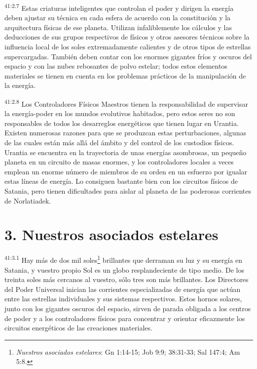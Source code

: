 \par
\textsuperscript{41:2.7} Estas criaturas inteligentes que controlan el poder y dirigen la energía deben ajustar su técnica en cada esfera de acuerdo con la constitución y la arquitectura físicas de ese planeta. Utilizan infaliblemente los cálculos y las deducciones de sus grupos respectivos de físicos y otros asesores técnicos sobre la influencia local de los soles extremadamente calientes y de otros tipos de estrellas supercargadas. También deben contar con los enormes gigantes fríos y oscuros del espacio y con las nubes rebosantes de polvo estelar; todos estos elementos materiales se tienen en cuenta en los problemas prácticos de la manipulación de la energía.

\par
\textsuperscript{41:2.8} Los Controladores Físicos Maestros tienen la responsabilidad de supervisar la energía-poder en los mundos evolutivos habitados, pero estos seres no son responsables de todos los desarreglos energéticos que tienen lugar en Urantia. Existen numerosas razones para que se produzcan estas perturbaciones, algunas de las cuales están más allá del ámbito y del control de los custodios físicos. Urantia se encuentra en la trayectoria de unas energías asombrosas, un pequeño planeta en un circuito de masas enormes, y los controladores locales a veces emplean un enorme número de miembros de su orden en un esfuerzo por igualar estas líneas de energía. Lo consiguen bastante bien con los circuitos físicos de Satania, pero tienen dificultades para aislar al planeta de las poderosas corrientes de Norlatiadek.

\section*{3. Nuestros asociados estelares}
\par
\textsuperscript{41:3.1} Hay más de dos mil soles\footnote{\textit{Nuestros asociados estelares}: Gn 1:14-15; Job 9:9; 38:31-33; Sal 147:4; Am 5:8.} brillantes que derraman su luz y su energía en Satania, y vuestro propio Sol es un globo resplandeciente de tipo medio. De los treinta soles más cercanos al vuestro, sólo tres son más brillantes. Los Directores del Poder Universal inician las corrientes especializadas de energía que actúan entre las estrellas individuales y sus sistemas respectivos. Estos hornos solares, junto con los gigantes oscuros del espacio, sirven de parada obligada a los centros de poder y a los controladores físicos para concentrar y orientar eficazmente los circuitos energéticos de las creaciones materiales.

